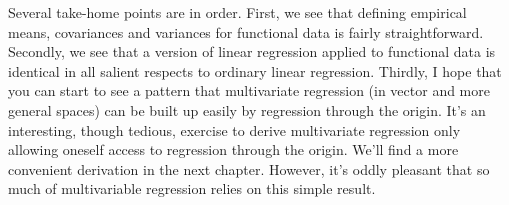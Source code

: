 Several take-home points are in order. First, we see that defining
empirical means, covariances and variances for functional data is
fairly straightforward. Secondly, we see that a version of linear
regression applied to functional data is identical in all salient
respects to ordinary linear regression. Thirdly, I hope that you
can start to see a pattern that multivariate regression (in vector
and more general spaces) can be built up easily by regression through
the origin. It's an interesting, though tedious, 
exercise to derive multivariate regression only allowing
oneself access to regression through the origin. 
We'll find a more convenient derivation in the next
chapter. However, it's oddly pleasant that so much of multivariable
regression relies on this simple result.

 








